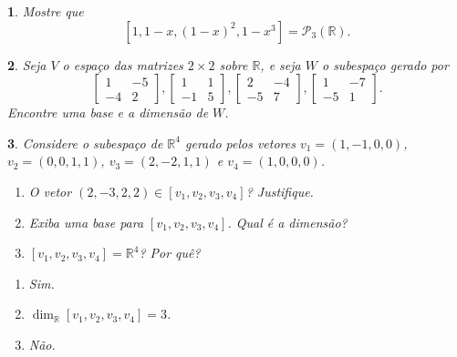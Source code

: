 \documentclass[12pt]{exam}
\newtheorem{exercicio}{}
\newcommand{\real}{\mathbb{R}}
\begin{document}
\begin{exercicio}
  Mostre que 
    \[
      [1, 1 - x, (1 - x)^2, 1 - x^3] = \mathcal{P}_3(\real).
    \]
\end{exercicio}

\begin{exercicio}
  Seja $V$ o espa\c{c}o das matrizes $2 \times 2$ sobre $\real$, e seja $W$ o subespa\c{c}o gerado por
  \[
    \begin{bmatrix}
      1 & -5\\
      -4 & 2
    \end{bmatrix},
    \begin{bmatrix}
      1 & 1\\
      -1 & 5
    \end{bmatrix},
    \begin{bmatrix}
      2 & -4\\
      -5 & 7
    \end{bmatrix},
    \begin{bmatrix}
      1 & -7\\
      -5 & 1
    \end{bmatrix}.
  \]
Encontre uma base e a dimens\~ao de $W$.
\end{exercicio}

\begin{exercicio}
  Considere o subespa\c{c}o de $\real^4$ gerado pelos vetores $v_1 = (1, -1, 0, 0)$, $v_2 = (0, 0, 1, 1)$, $v_3 = (2, -2, 1, 1)$ e $v_4 = (1, 0, 0, 0)$.
  \begin{enumerate}[label={\alph*})]
    \item O vetor $(2, -3, 2, 2) \in [v_1, v_2, v_3, v_4]$? Justifique.
    \item Exiba uma base para $[v_1, v_2, v_3, v_4]$. Qual \'e a dimens\~ao?
    \item $[v_1, v_2, v_3, v_4] = \real^4$? Por qu\^e?
  \end{enumerate}
  \begin{solucao}
    \begin{enumerate}[label={\alph*})]
      \item Sim.
      \item $\dim_\real [v_1, v_2, v_3, v_4] = 3$.
      \item N\~ao.
    \end{enumerate}
  \end{solucao}
\end{exercicio}
\end{document}
